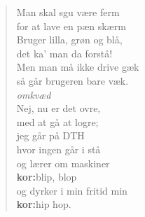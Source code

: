 \documentclass[a4paper,11pt]{article}
\begin{document}
\begin{verse}
\bigskip
Man skal sgu være ferm\\
for at lave en pæn skærm\\
Bruger lilla, grøn og blå,\\
det ka' man da forstå!\\
Men man må ikke drive gæk\\
så går brugeren bare væk.\\
\medskip
{\em omkvæd}\\
\bigskip
Nej, nu er det ovre,\\
med at gå at logre;\\
jeg går på DTH\\
hvor ingen går i stå\\
og lærer om maskiner\\
{\bf kor:}\/blip, blop\\
og dyrker i min fritid min\\
{\bf kor:}\/hip hop.\\

\end{verse}
\end{document}
